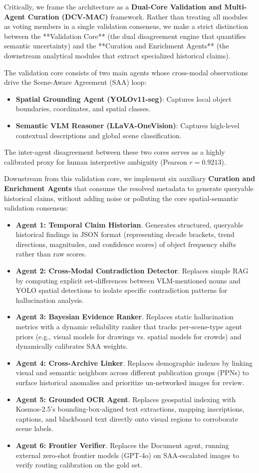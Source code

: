 \documentclass[12pt,onecolumn,a4paper]{IEEEtran}
\begin{document}
Critically, we frame the architecture as a \textbf{Dual-Core Validation and Multi-Agent Curation (DCV-MAC)} framework. Rather than treating all modules as voting members in a single validation consensus, we make a strict distinction between the **Validation Core** (the dual disagreement engine that quantifies semantic uncertainty) and the **Curation and Enrichment Agents** (the downstream analytical modules that extract specialized historical claims).

The validation core consists of two main agents whose cross-modal observations drive the Scene-Aware Agreement (SAA) loop:
\begin{itemize}
    \item \textbf{Spatial Grounding Agent (YOLOv11-seg)}: Captures local object boundaries, coordinates, and spatial classes.
    \item \textbf{Semantic VLM Reasoner (LLaVA-OneVision)}: Captures high-level contextual descriptions and global scene classification.
\end{itemize}
The inter-agent disagreement between these two cores serves as a highly calibrated proxy for human interpretive ambiguity (Pearson $r = 0.9213$). 

Downstream from this validation core, we implement six auxiliary \textbf{Curation and Enrichment Agents} that consume the resolved metadata to generate queryable historical claims, without adding noise or polluting the core spatial-semantic validation consensus:
\begin{itemize}
    \item \textbf{Agent 1: Temporal Claim Historian}. Generates structured, queryable historical findings in JSON format (representing decade brackets, trend directions, magnitudes, and confidence scores) of object frequency shifts rather than raw scores.
    \item \textbf{Agent 2: Cross-Modal Contradiction Detector}. Replaces simple RAG by computing explicit set-differences between VLM-mentioned nouns and YOLO spatial detections to isolate specific contradiction patterns for hallucination analysis.
    \item \textbf{Agent 3: Bayesian Evidence Ranker}. Replaces static hallucination metrics with a dynamic reliability ranker that tracks per-scene-type agent priors (e.g., visual models for drawings vs. spatial models for crowds) and dynamically calibrates SAA weights.
    \item \textbf{Agent 4: Cross-Archive Linker}. Replaces demographic indexes by linking visual and semantic neighbors across different publication groups (PPNs) to surface historical anomalies and prioritize un-networked images for review.
    \item \textbf{Agent 5: Grounded OCR Agent}. Replaces geospatial indexing with Kosmos-2.5's bounding-box-aligned text extractions, mapping inscriptions, captions, and blackboard text directly onto visual regions to corroborate scene labels.
    \item \textbf{Agent 6: Frontier Verifier}. Replaces the Document agent, running external zero-shot frontier models (GPT-4o) on SAA-escalated images to verify routing calibration on the gold set.
\end{itemize}
\end{document}
